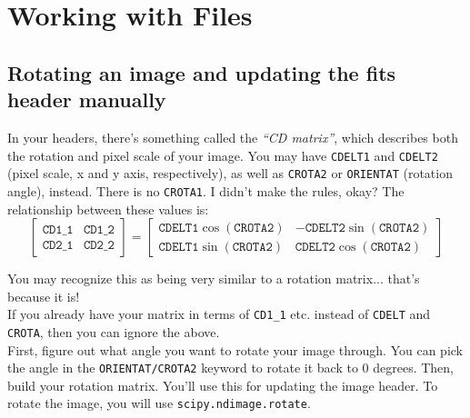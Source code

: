 \section{Working with Files}
\subsection{Rotating an image and updating the fits header manually}

In your headers, there's something called the \textit{``CD matrix''}, which describes both the rotation and pixel scale of your image. You may have \texttt{CDELT1} and \texttt{CDELT2} (pixel scale, x and y axis, respectively), as well as \texttt{CROTA2} or \texttt{ORIENTAT} (rotation angle), instead. There is no \texttt{CROTA1}. I didn't make the rules, okay? The relationship between these values is:
\begin{equation}
    \begin{bmatrix}
    \texttt{CD1\_1} & \texttt{CD1\_2} \\
    \texttt{CD2\_1} & \texttt{CD2\_2}
    \end{bmatrix}
    = 
    \begin{bmatrix}
    \texttt{CDELT1}\cos{(\texttt{CROTA2})} & -\texttt{CDELT2}\sin{(\texttt{CROTA2})} \\
    \texttt{CDELT1}\sin{(\texttt{CROTA2})} & \texttt{CDELT2}\cos{(\texttt{CROTA2})}
    \end{bmatrix}
\end{equation}

You may recognize this as being very similar to a rotation matrix... that's because it is! \\

If you already have your matrix in terms of \texttt{CD1\_1} etc. instead of \texttt{CDELT} and \texttt{CROTA}, then you can ignore the above. \\

First, figure out what angle you want to rotate your image through. You can pick the angle in the \texttt{ORIENTAT/CROTA2} keyword to rotate it back to 0 degrees. Then, build your rotation matrix. You'll use this for updating the image header. To rotate the image,  you will use \texttt{scipy.ndimage.rotate}.

